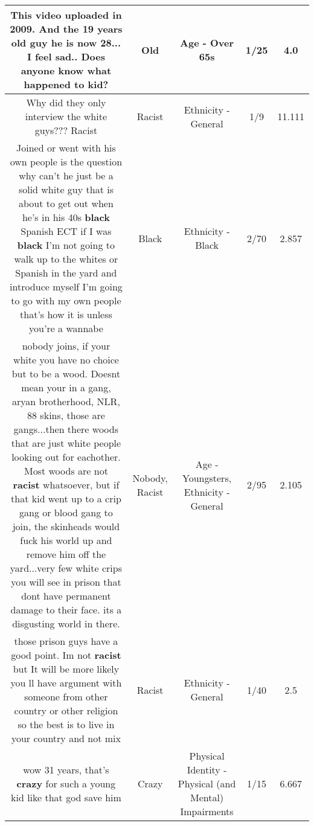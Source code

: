 \documentclass[11pt]{article}
\newlength\mylength
\begin{document}
\begin{center}
\begin{longtable}{|C{.65\mylength}|C{.30\mylength}|C{.12\mylength}|C{.12\mylength}|C{.12\mylength}|}
  \small This video uploaded in 2009. And the 19 years \textbf{old} guy he is now 28... I feel sad.. Does anyone know what happened to kid?\normalsize   & Old & Age - Over 65s & 1/25 & 4.0 \\  \hline
  \small Why did they only interview the white guys??? Racist\normalsize   & Racist & Ethnicity - General & 1/9 & 11.111 \\  \hline
  \small Joined or went with his own people is the question why can't he just be a solid white guy that is about to get out when he's in his 40s \textbf{black} Spanish ECT if I was \textbf{black} I'm not going to walk up to the whites or Spanish in the yard and introduce myself I'm going to go with my own people that's how it is unless you're a wannabe\normalsize   & Black & Ethnicity - Black & 2/70 & 2.857 \\  \hline
  \small nobody joins, if your white you have no choice but to be a wood. Doesnt mean your in a gang, aryan brotherhood, NLR, 88 skins, those are gangs...then there woods that are just white people looking out for eachother. Most woods are not \textbf{racist} whatsoever, but if that kid went up to a crip gang or blood gang to join, the skinheads would fuck his world up and remove him off the yard...very few white crips you will see in prison that dont have permanent damage to their face. its a disgusting world in there.\normalsize   & Nobody, Racist & Age - Youngsters, Ethnicity - General & 2/95 & 2.105 \\  \hline
  \small those prison guys have a good point. Im not \textbf{racist} but It will be more likely you ll have argument with someone from other country or other religion so the best is to live in your country and not mix\normalsize   & Racist & Ethnicity - General & 1/40 & 2.5 \\  \hline
  \small wow 31 years, that's \textbf{crazy} for such a young kid like that god save him\normalsize   & Crazy & Physical Identity - Physical (and Mental) Impairments & 1/15 & 6.667 \\  \hline

\end{longtable}
\end{center}
\end{document}
